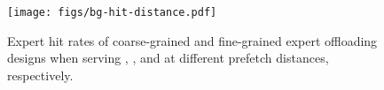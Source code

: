 








\begin{figure}[t]
  \centering
  \texttt{[image: figs/bg-hit-distance.pdf]}
  \vspace{-0.1in}
  \caption{Expert hit rates of coarse-grained and fine-grained expert offloading designs when serving \mixtral, \qwen, and \phimoe at different prefetch distances, respectively.}
  \vspace{-0.15in}
  \label{fig:bg-hit-distance}
\end{figure}


